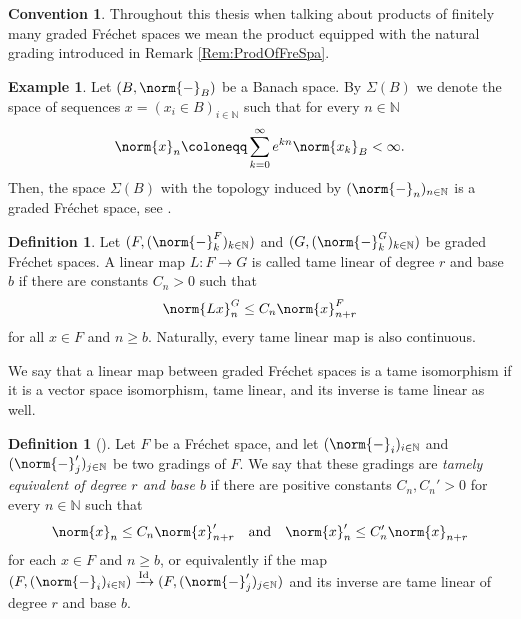 \documentclass[12pt,a4paper]{article}
\theoremstyle{plain}
\theoremstyle{definition}
\newtheorem{definition}[theorem]{Definition}
\newtheorem{example}[theorem]{Example}
\newtheorem{convention}[theorem]{Convention}
\newcommand{\N}{\mathbb{N}}
\newcommand{\nnorm}[2]{\norm{#1}_{#2}}
\begin{document}
\begin{convention}
\label{Conv:ProdOfFreSpa}
Throughout this thesis when talking about products of finitely many graded Fréchet spaces we mean the product equipped with the natural grading introduced in Remark \ref{Rem:ProdOfFreSpa}.
\end{convention}



\begin{example}
\label{Example:Sigma(B)}
Let $(B,\nnorm{-}{B})$ be a Banach space. By $\Sigma(B)$ we denote the space of sequences $x=(x_i\in B)_{i\in \N}$ such that for every $n\in \N$ 
\begin{align*}
    \nnorm{x}{n}\coloneqq \sum_{k=0}^\infty e^{kn}\nnorm{x_k}{B}<\infty.
\end{align*}
Then, the space $\Sigma(B)$ with the topology induced by $(\nnorm{-}{n})_{n\in \N}$ is a graded Fréchet space, see \cite[Part II, Examples 1.1.2 (2)]{hamilton}.
\end{example}

\begin{definition}
\label{Def:TameLinMap}
Let $(F,(\nnorm{-}{k}^F)_{k\in\N})$ and $(G,(\nnorm{-}{k}^G)_{k\in\N})$ be graded Fréchet spaces. A linear map $L:F\to G$ is called tame linear of degree $r$ and base $b$ if there are constants $C_n>0$ such that 
\begin{align*}
    \nnorm{Lx}{n}^G\leq C_n \nnorm{x}{n+r}^F
\end{align*}
for all $x\in F$ and $n\geq b$. Naturally, every tame linear map is also continuous.

We say that a linear map between graded Fréchet spaces is a tame isomorphism if it is a vector space isomorphism, tame linear, and its inverse is tame linear as well.
\end{definition}


\begin{definition}[{\cite[Part II, Definition 1.1.3]{hamilton}}]
Let $F$ be a Fréchet space, and let $(\nnorm{-}{i})_{i\in \N}$ and $(\nnorm{-}{j}')_{j\in \N}$ be two gradings of $F$. We say that these gradings are \textit{tamely equivalent of degree $r$ and base $b$} if there are positive constants $C_n,C_n'>0$ for every $n\in \N$ such that
\begin{alignat*}{1}
    \nnorm{x}{n}\leq C_n \nnorm{x}{n+r}'\quad \textnormal{and} \quad \nnorm{x}{n}'\leq C_n' \nnorm{x}{n+r}
\end{alignat*}
for each $x\in F$ and $n\geq b$, or equivalently if the map $(F,(\nnorm{-}{i})_{i\in \N})\xrightarrow{\mathrm{Id}} (F,(\nnorm{-}{j}')_{j\in \N})$ and its inverse are tame linear of degree $r$ and base $b$.
\end{definition}
\end{document}
